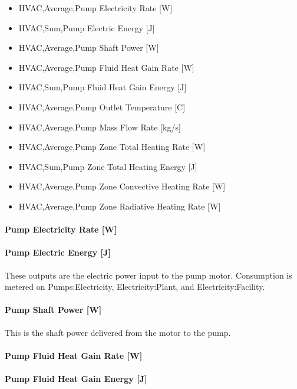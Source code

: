 \begin{itemize}
\item
  HVAC,Average,Pump Electricity Rate {[}W{]}
\item
  HVAC,Sum,Pump Electric Energy {[}J{]}
\item
  HVAC,Average,Pump Shaft Power {[}W{]}
\item
  HVAC,Average,Pump Fluid Heat Gain Rate {[}W{]}
\item
  HVAC,Sum,Pump Fluid Heat Gain Energy {[}J{]}
\item
  HVAC,Average,Pump Outlet Temperature {[}C{]}
\item
  HVAC,Average,Pump Mass Flow Rate {[}kg/s{]}
\item
  HVAC,Average,Pump Zone Total Heating Rate {[}W{]}
\item
  HVAC,Sum,Pump Zone Total Heating Energy {[}J{]}
\item
  HVAC,Average,Pump Zone Convective Heating Rate {[}W{]}
\item
  HVAC,Average,Pump Zone Radiative Heating Rate {[}W{]}
\end{itemize}

\paragraph{Pump Electricity Rate {[}W{]}}\label{pump-electric-power-w}

\paragraph{Pump Electric Energy {[}J{]}}\label{pump-electric-energy-j}

These outputs are the electric power input to the pump motor. Consumption is metered on Pumps:Electricity, Electricity:Plant, and Electricity:Facility.

\paragraph{Pump Shaft Power {[}W{]}}\label{pump-shaft-power-w}

This is the shaft power delivered from the motor to the pump.

\paragraph{Pump Fluid Heat Gain Rate {[}W{]}}\label{pump-fluid-heat-gain-rate-w}

\paragraph{Pump Fluid Heat Gain Energy {[}J{]}}\label{pump-fluid-heat-gain-energy-j}


